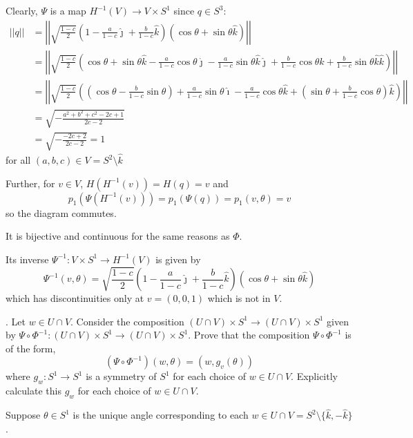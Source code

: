 \documentclass[12pt]{article}
\newcommand{\lra}{\longrightarrow}
\newcommand{\norm}[1]{\left\vert \left\vert #1 \right\vert \right\vert}
\newcommand{\ihat}{\hat \imath}
\newcommand{\jhat}{\hat \jmath}
\newcommand{\khat}{\hat k}
\begin{document}
        Clearly, $\Psi$ is a map $H^{-1}(V) \to V \times S^1$ since $q \in S^3$: 
        \begin{align*}
            \norm{q} &= \norm{\sqrt{\frac{1 - c}{2}}\left(1 - \frac{a}{1 - c}\jhat + \frac{b}{1 - c}\khat\right)(\cos \theta + \sin \theta \khat)}\\ 
            &= \norm{\sqrt{\frac{1 - c}{2}}\left(\cos \theta + \sin \theta \khat - \frac{a}{1 - c}\cos \theta \jhat - \frac{a}{1 - c} \sin \theta \khat\jhat + \frac{b}{1 - c} \cos \theta \khat + \frac{b}{1 - c} \sin \theta \khat \khat\right)}\\ 
            &= \norm{\sqrt{\frac{1- c}{2}}\left((\cos \theta - \frac{b}{1 - c}\sin \theta) + \frac{a}{1 - c}\sin \theta \ihat - \frac{a}{1- c}\cos \theta \khat + (\sin \theta + \frac{b}{1 -c} \cos \theta)\khat\right)}\\ 
            &= \sqrt{-\frac{a^2 + b^2 + c^2 - 2c + 1}{2c - 2}}\\ 
            &= \sqrt{-\frac{-2c + 2}{2c - 2}} = 1
        \end{align*}
        for all $(a, b, c) \in V = S^2\setminus \khat$

        Further, for $v \in V$, $H(H^{-1}(v)) = H(q) = v$ and 
        \[p_1(\Psi(H^{-1}(v))) = p_1(\Psi(q)) = p_1(v, \theta) = v\]
        so the diagram commutes. 

        It is bijective and continuous for the same reasons as $\Phi$. 
        
        Its inverse $\Psi^{-1}: V \times S^1 \to H^{-1}(V)$ is given by 
        \[\Psi^{-1}(v, \theta) = \sqrt{\frac{1 - c}{2}}\left(1 - \frac{a}{1 - c}\jhat + \frac{b}{1 - c}\khat\right)(\cos \theta + \sin \theta \khat)\]
        which has discontinuities only at $v = (0, 0, 1)$ which is not in $V$.
    \color{black}

.  Let $w \in U \cap V$.  Consider the composition $(U\cap V)\times S^{1} \lra (U\cap V)\times S^{1}$ given by $\Psi \circ \Phi^{-1} : (U\cap V)\times S^{1} \lra (U\cap V)\times S^{1}$.  Prove that the composition $\Psi\circ \Phi^{-1}$ is of the form,
\[(\Psi \circ \Phi^{-1})(w,\theta) = \left(w, g_{v}(\theta)\right)\]
where $g_{w}: S^{1} \lra S^{1}$ is a symmetry of $S^{1}$ for each choice of $w \in U \cap V$.  Explicitly calculate this $g_{w}$ for each choice of $w \in U \cap V$.  

    \color{blue}
        Suppose $\theta \in S^1$ is the unique angle corresponding to each $w \in U \cap V = S^2\setminus \{\khat, -\khat\}$. 
\end{document}
